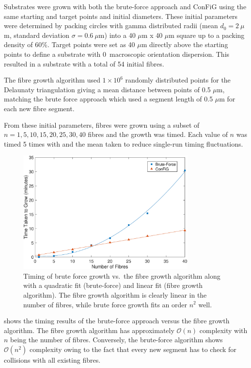 Substrates were grown with both the brute-force approach and ConFiG using the same starting and target points and initial diameters.
These initial parameters were determined by packing circles with gamma distributed radii (mean $d_0 = 2\ \mu$m, standard deviation $\sigma = 0.6\ \mu$m) into a 40 $\mu$m x 40 $\mu$m square up to a packing density of 60\%. Target points were set as 40 $\mu$m directly above the starting points to define a substrate with 0\degree\ macroscopic orientation dispersion.
This resulted in a substrate with a total of 54 initial fibres. 

The fibre growth algorithm used $1\times 10^6$ randomly distributed points for the Delaunaty triangulation giving a mean distance between points of 0.5 $\mu$m, matching the brute force approach which used a segment length of 0.5 $\mu$m for each new fibre segment. 

From these initial parameters, fibres were grown using a subset of $n = 1, 5, 10, 15, 20, 25, 30, 40$ fibres and the growth was timed. Each value of $n$ was timed 5 times with and the mean taken to reduce single-run timing fluctuations.

\begin{figure}[h!]
  \centering
  \includegraphics[width=0.8\textwidth]{figures/config/brute_force_vs_algo_2.eps}
  \caption{\small Timing of brute force growth vs.\ the fibre growth algorithm along with a quadratic fit (brute-force) and linear fit (fibre growth algorithm). The fibre growth algorithm is clearly linear in the number of fibres, while brute force growth fits an order $n^2$ well. }
  \label{fig:brute_force_vs_algo}
\end{figure}

 shows the timing results of the brute-force approach versus the fibre growth algorithm.
The fibre growth algorithm  has approximately $\mathcal{O}(n)$ complexity with $n$ being the number of fibres.
Conversely, the brute-force algorithm shows $\mathcal{O}(n^2)$ complexity owing to the fact that every new segment has to check for collisions with all existing fibres.

